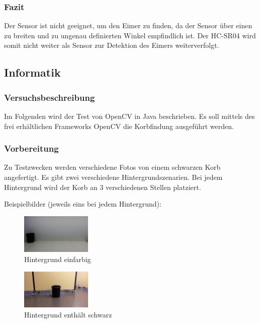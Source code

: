 \subsubsection{Fazit}
Der Sensor ist nicht geeignet, um den Eimer zu finden, da der Sensor über 
einen zu breiten und zu ungenau definierten Winkel empfindlich ist. Der 
HC-SR04 wird somit nicht weiter als Sensor zur Detektion des Eimers 
weiterverfolgt. 

\subsection{Informatik}

\subsubsection{Versuchsbeschreibung}
Im Folgenden wird der Test von OpenCV in Java beschrieben. Es soll mittels des 
frei erhältlichen Frameworks OpenCV die Korbfindung ausgeführt werden.

\subsubsection{Vorbereitung}
Zu Testzwecken werden verschiedene Fotos von einem schwarzen Korb angefertigt. 
Es gibt zwei verschiedene Hintergrundszenarien. Bei jedem Hintergrund wird der 
Korb an 3 verschiedenen Stellen platziert.

Beispielbilder (jeweils eins bei jedem Hintergrund):

\begin{figure}[h!]
    \centering
    \includegraphics[width=0.3\textwidth]{fig/korb4.jpg}
    \caption{Hintergrund einfarbig}
    \label{fig:Korb_HEinfarbig}
\end{figure}

\begin{figure}[h!]
    \centering
    \includegraphics[width=0.3\textwidth]{fig/korb1.jpg}
    \caption{Hintergrund enthält schwarz}
    \label{fig:Korb_HSchwarz}
\end{figure}

